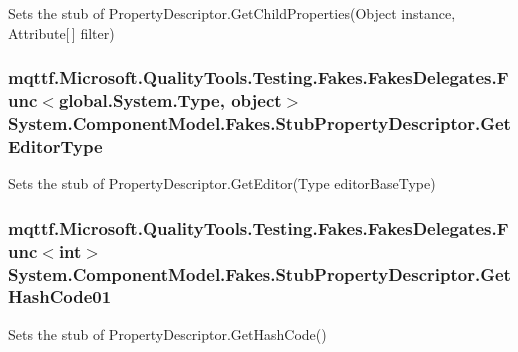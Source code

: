 Sets the stub of Property\-Descriptor.\-Get\-Child\-Properties(\-Object instance, Attribute\mbox{[}$\,$\mbox{]} filter)

\hypertarget{class_system_1_1_component_model_1_1_fakes_1_1_stub_property_descriptor_a45f009053c80d442d34ccd29fa3044c9}{
\subsubsection[{Get\-Editor\-Type}]{\setlength{\rightskip}{0pt plus 5cm}mqttf.\-Microsoft.\-Quality\-Tools.\-Testing.\-Fakes.\-Fakes\-Delegates.\-Func$<$global.\-System.\-Type, object$>$ System.\-Component\-Model.\-Fakes.\-Stub\-Property\-Descriptor.\-Get\-Editor\-Type}}\label{class_system_1_1_component_model_1_1_fakes_1_1_stub_property_descriptor_a45f009053c80d442d34ccd29fa3044c9}


Sets the stub of Property\-Descriptor.\-Get\-Editor(\-Type editor\-Base\-Type)

\hypertarget{class_system_1_1_component_model_1_1_fakes_1_1_stub_property_descriptor_a9fe4549f2cc975180c8a41b08afacc24}{
\subsubsection[{Get\-Hash\-Code01}]{\setlength{\rightskip}{0pt plus 5cm}mqttf.\-Microsoft.\-Quality\-Tools.\-Testing.\-Fakes.\-Fakes\-Delegates.\-Func$<$int$>$ System.\-Component\-Model.\-Fakes.\-Stub\-Property\-Descriptor.\-Get\-Hash\-Code01}}\label{class_system_1_1_component_model_1_1_fakes_1_1_stub_property_descriptor_a9fe4549f2cc975180c8a41b08afacc24}


Sets the stub of Property\-Descriptor.\-Get\-Hash\-Code()

